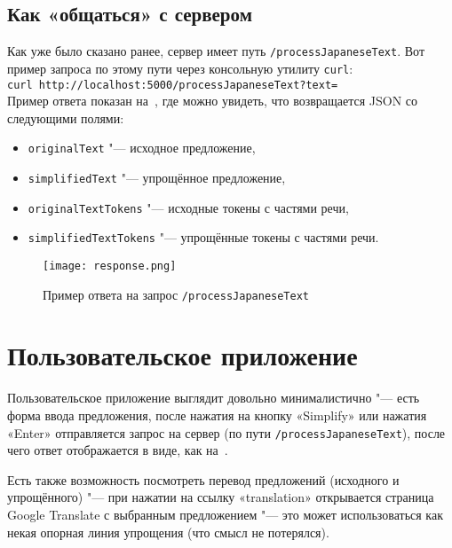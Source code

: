 \subsection{Как «общаться» с сервером}


Как уже было сказано ранее, сервер имеет путь \texttt{/processJapaneseText}.
Вот пример запроса по этому пути через консольную утилиту \texttt{curl}: \\ 
\texttt{curl http://localhost:5000/processJapaneseText?text=} \\ 
Пример ответа показан на~, где можно увидеть, что возвращается JSON со следующими полями:
\begin{itemize}%
  \item \texttt{originalText} "--- исходное предложение,
  \item \texttt{simplifiedText} "--- упрощённое предложение,
  \item \texttt{originalTextTokens} "--- исходные токены с частями речи,
  \item \texttt{simplifiedTextTokens} "--- упрощённые токены с частями речи.
\end{itemize}
\begin{figure}[H]%
  \centering
  \texttt{[image: response.png]}
  \caption{Пример ответа на запрос \texttt{/processJapaneseText}}
  \label{response}
\end{figure}


\section{Пользовательское приложение}


Пользовательское приложение выглядит довольно минималистично "--- есть форма ввода предложения, после нажатия на кнопку «Simplify» или нажатия «Enter» отправляется запрос на сервер (по пути \texttt{/processJapaneseText}), после чего ответ отображается в виде, как на~.

Есть также возможность посмотреть перевод предложений (исходного и упрощённого) "--- при нажатии на ссылку «translation» открывается страница Google Translate с выбранным предложением "--- это может использоваться как некая опорная линия упрощения (что смысл не потерялся).

